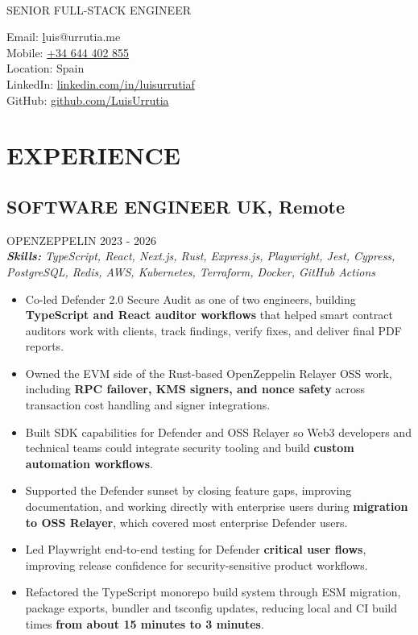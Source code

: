 \documentclass{article}
\newcommand{\WorkExperience}[2]{
   \subsection*{#1}
   \vspace{-1em}
   \uppercase{#2}
}
\newcommand{\Skills}[1]{
   \textit{\textbf{Skills:} #1}
}
\begin{document}
\begin{center}
	\begin{minipage}{0.5\textwidth}
		{\fontsize{24}{28}\Title{}} \\
		\bigskip
		{\normalsize \MakeUppercase{Senior Full-Stack Engineer}}
	\end{minipage} \hfill
	\begin{minipage}{0.4\textwidth}
		\raggedleft{}
		Email: \href{mailto:luis@urrutia.me}luis@urrutia.me \\
		Mobile: \href{tel:+34644402855}{+34 644 402 855}  \\
		Location: Spain \\
		LinkedIn: \href{https://linkedin.com/in/luisurrutiaf}{linkedin.com/in/luisurrutiaf} \\
		GitHub: \href{https://github.com/LuisUrrutia}{github.com/LuisUrrutia}
	\end{minipage}
\end{center}

\vspace{-3em}

\phantom{Amazon, Microsoft, Facebook} %

\section*{EXPERIENCE}
\WorkExperience{SOFTWARE ENGINEER \hfill UK, Remote}{OpenZeppelin \hfill 2023 {-} 2026} \\
\Skills{TypeScript, React, Next.js, Rust, Express.js, Playwright, Jest, Cypress, PostgreSQL, Redis, AWS, Kubernetes, Terraform, Docker, GitHub Actions}
\begin{itemize}
	\item Co-led Defender 2.0 Secure Audit as one of two engineers, building \textbf{TypeScript and React auditor workflows} that helped smart contract auditors work with clients, track findings, verify fixes, and deliver final PDF reports.
	\item Owned the EVM side of the Rust-based OpenZeppelin Relayer OSS work, including \textbf{RPC failover, KMS signers, and nonce safety} across transaction cost handling and signer integrations.
	\item Built SDK capabilities for Defender and OSS Relayer so Web3 developers and technical teams could integrate security tooling and build \textbf{custom automation workflows}.
	\item Supported the Defender sunset by closing feature gaps, improving documentation, and working directly with enterprise users during \textbf{migration to OSS Relayer}, which covered most enterprise Defender users.
	\item Led Playwright end-to-end testing for Defender \textbf{critical user flows}, improving release confidence for security-sensitive product workflows.
	\item Refactored the TypeScript monorepo build system through ESM migration, package exports, bundler and tsconfig updates, reducing local and CI build times \textbf{from about 15 minutes to 3 minutes}.
\end{itemize}
\end{document}
